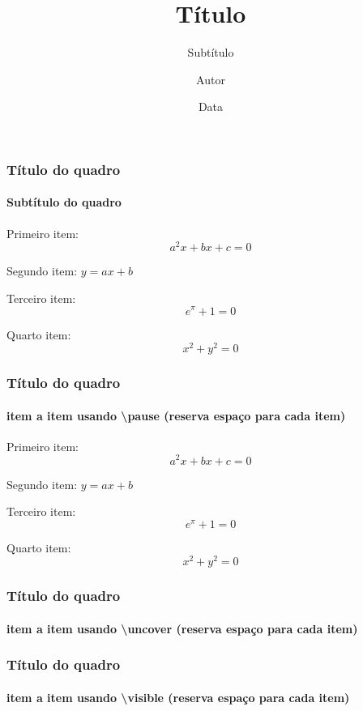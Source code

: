 \documentclass[aspectratio=43]{beamer}
\title{Título}
\subtitle{Subtítulo}
\author[A.]{Autor}
\institute[Inst.]{Instituição}
\date{Data}
\begin{document}
\begin{frame}
	\titlepage
\end{frame}

\begin{frame}
	\frametitle{Título do quadro}
	\framesubtitle{Subtítulo do quadro}
	
	Primeiro item:
	\[ a^2x + bx +c = 0\]
	
	Segundo item: $y = ax + b$
	
	Terceiro item:
	$$ e^\pi + 1 = 0 $$
	
	Quarto item:
	$$ x^2 + y^2 = 0 $$
	
\end{frame}

\begin{frame}
	\frametitle{Título do quadro}
	\framesubtitle{item a item usando \textbackslash pause (reserva espaço para cada item)}
	
	Primeiro item:
	\[ a^2x + bx +c = 0\] \pause
	
	Segundo item: $y = ax + b$ \pause
	
	Terceiro item:
	$$ e^\pi + 1 = 0 $$ \pause
	
	Quarto item:
	$$ x^2 + y^2 = 0 $$
	
\end{frame}

\begin{frame}
	\frametitle{Título do quadro}
	\framesubtitle{item a item usando \textbackslash uncover (reserva espaço para cada item)}
	
	
	
	
	
\end{frame}

\begin{frame}
	\frametitle{Título do quadro}
	\framesubtitle{item a item usando \textbackslash visible (reserva espaço para cada item)}
	
	
	
	
	
\end{frame}
\end{document}
